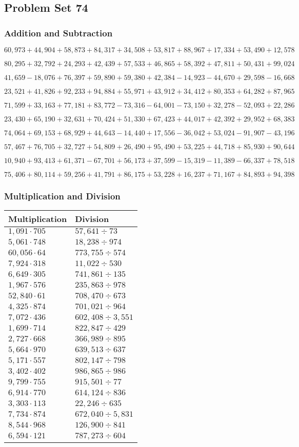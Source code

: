 \hypertarget{problem-set-74}{%
\subsection{Problem Set 74}\label{problem-set-74}}

\hypertarget{addition-and-subtraction-296}{%
\subsubsection{Addition and
Subtraction}\label{addition-and-subtraction-296}}

\(60,973+44,904+58,873+84,317+34,508+53,817+88,967+17,334+53,490+ 12,578\)

\(80,295+32,792+24,293+42,439+57,533+46,865+58,392+47,811+50,431+99,024\)

\(41,659-18,076+76,397+59,890+59,380+42,384-14,923-44,670+29,598-16,668\)

\(23,521+41,826+92,233+94,884+55,971+43,912+34,412+80,353+64,282+87,965\)

\(71,599+33,163+77,181+83,772-73,316-64,001-73,150+32,278-52,093+22,286\)

\(23,430+65,190+32,631+70,424+51,330+67,423+44,017+42,392+29,952+68,383\)

\(74,064+69,153+68,929+44,643-14,440+17,556-36,042+53,024-91,907-43,196\)

\(57,467+76,705+32,727+54,809+26,490+95,490+53,225+44,718+85,930+90,644\)

\(10,940+93,413+61,371-67,701+56,173+37,599-15,319-11,389-66,337+78,518\)

\(75,406+80,114+59,256+41,791+86,175+53,228+16,237+71,167+84,893+94,398\)

\hypertarget{multiplication-and-division-295}{%
\subsubsection{Multiplication and
Division}\label{multiplication-and-division-295}}

\begin{longtable}[]{@{}ll@{}}
\toprule
Multiplication & Division\tabularnewline
\midrule
\endhead
\(1,091\cdot705\) & \(57,641÷73\)\tabularnewline
\(5,061\cdot748\) & \(18,238÷974\)\tabularnewline
\(60,056\cdot64\) & \(773,755÷574\)\tabularnewline
\(7,924\cdot318\) & \(11,022÷530\)\tabularnewline
\(6,649\cdot305\) & \(741,861÷135\)\tabularnewline
\(1,967\cdot576\) & \(235,863÷978\)\tabularnewline
\(52,840\cdot61\) & \(708,470÷673\)\tabularnewline
\(4,325\cdot874\) & \(701,021÷964\)\tabularnewline
\(7,072\cdot436\) & \(602,408÷3,551\)\tabularnewline
\(1,699\cdot714\) & \(822,847÷429\)\tabularnewline
\(2,727\cdot668\) & \(366,989÷895\)\tabularnewline
\(5,664\cdot970\) & \(639,513÷637\)\tabularnewline
\(5,171\cdot557\) & \(802,147÷798\)\tabularnewline
\(3,402\cdot402\) & \(986,865÷986\)\tabularnewline
\(9,799\cdot755\) & \(915,501÷77\)\tabularnewline
\(6,914\cdot770\) & \(614,124÷836\)\tabularnewline
\(3,303\cdot113\) & \(22,246÷635\)\tabularnewline
\(7,734\cdot874\) & \(672,040÷5,831\)\tabularnewline
\(8,544\cdot968\) & \(126,900÷841\)\tabularnewline
\(6,594\cdot121\) & \(787,273÷604\)\tabularnewline
\bottomrule
\end{longtable}

